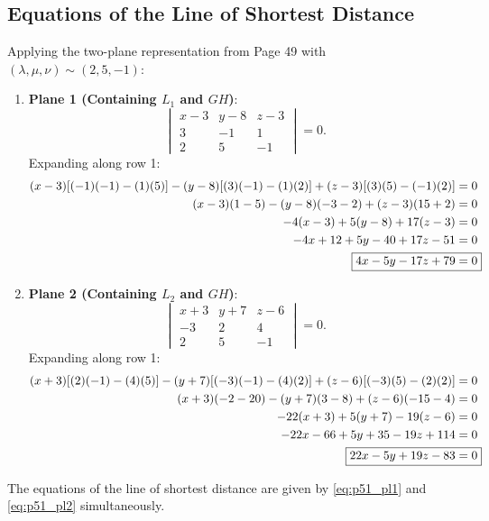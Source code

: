 \subsection{Equations of the Line of Shortest Distance}
Applying the two-plane representation from Page 49 with $(\lambda, \mu, \nu) \sim (2, 5, -1)$:
\begin{enumerate}
    \item \textbf{Plane 1 (Containing $L_1$ and $GH$)}:
    \begin{equation}
        \begin{vmatrix}
        x - 3 & y - 8 & z - 3 \\
        3 & -1 & 1 \\
        2 & 5 & -1
        \end{vmatrix} = 0.
    \end{equation}
    Expanding along row 1:
    \begin{align}
        (x - 3)[(-1)(-1) - (1)(5)] - (y - 8)[(3)(-1) - (1)(2)] + (z - 3)[(3)(5) - (-1)(2)] &= 0 \nonumber\\
        (x - 3)(1 - 5) - (y - 8)(-3 - 2) + (z - 3)(15 + 2) &= 0 \nonumber\\
        -4(x - 3) + 5(y - 8) + 17(z - 3) &= 0 \nonumber\\
        -4x + 12 + 5y - 40 + 17z - 51 &= 0 \nonumber\\
        \Aboxed{4x - 5y - 17z + 79 &= 0} \label{eq:p51_pl1}
    \end{align}
    \item \textbf{Plane 2 (Containing $L_2$ and $GH$)}:
    \begin{equation}
        \begin{vmatrix}
        x + 3 & y + 7 & z - 6 \\
        -3 & 2 & 4 \\
        2 & 5 & -1
        \end{vmatrix} = 0.
    \end{equation}
    Expanding along row 1:
    \begin{align}
        (x + 3)[(2)(-1) - (4)(5)] - (y + 7)[(-3)(-1) - (4)(2)] + (z - 6)[(-3)(5) - (2)(2)] &= 0 \nonumber\\
        (x + 3)(-2 - 20) - (y + 7)(3 - 8) + (z - 6)(-15 - 4) &= 0 \nonumber\\
        -22(x + 3) + 5(y + 7) - 19(z - 6) &= 0 \nonumber\\
        -22x - 66 + 5y + 35 - 19z + 114 &= 0 \nonumber\\
        \Aboxed{22x - 5y + 19z - 83 &= 0} \label{eq:p51_pl2}
    \end{align}
\end{enumerate}
The equations of the line of shortest distance are given by \eqref{eq:p51_pl1} and \eqref{eq:p51_pl2} simultaneously.

